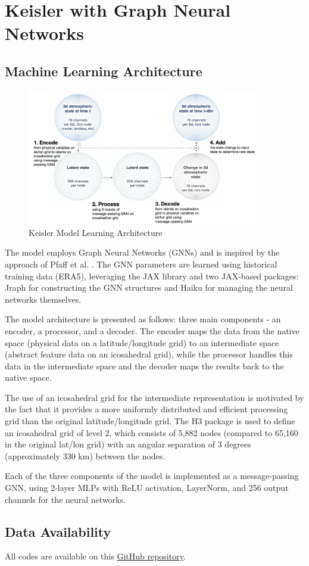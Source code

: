 \section{Keisler with Graph Neural Networks}

\subsection{Machine Learning Architecture}

\begin{figure}[ht]
\centering
\includegraphics[width=0.9\textwidth]{media/Keisler_archi.png}
\caption{Keisler Model Learning Architecture}
\label{fig}
\end{figure}

The model employs Graph Neural Networks (GNNs) and is inspired by the approach of Pfaff et al. \cite{pfaff}. The GNN parameters are learned using historical training data (ERA5), leveraging the JAX library and two JAX-based packages: Jraph for constructing the GNN structures and Haiku for managing the neural networks themselves.

The model architecture is presented as follows: three main components - an encoder, a processor, and a decoder. The encoder maps the data from the native space (physical data on a latitude/longitude grid) to an intermediate space (abstract feature data on an icosahedral grid), while the processor handles this data in the intermediate space and the decoder maps the results back to the native space.

The use of an icosahedral grid for the intermediate representation is motivated by the fact that it provides a more uniformly distributed and efficient processing grid than the original latitude/longitude grid. The H3 package is used to define an icosahedral grid of level 2, which consists of 5,882 nodes (compared to 65,160 in the original lat/lon grid) with an angular separation of 3 degrees (approximately 330 km) between the nodes.

Each of the three components of the model is implemented as a message-passing GNN, using 2-layer MLPs with ReLU activation, LayerNorm, and 256 output channels for the neural networks.

\subsection{Data Availability}

All codes are available on this \href{https://github.com/openclimatefix/graph_weather/tree/main}{GitHub repository}.